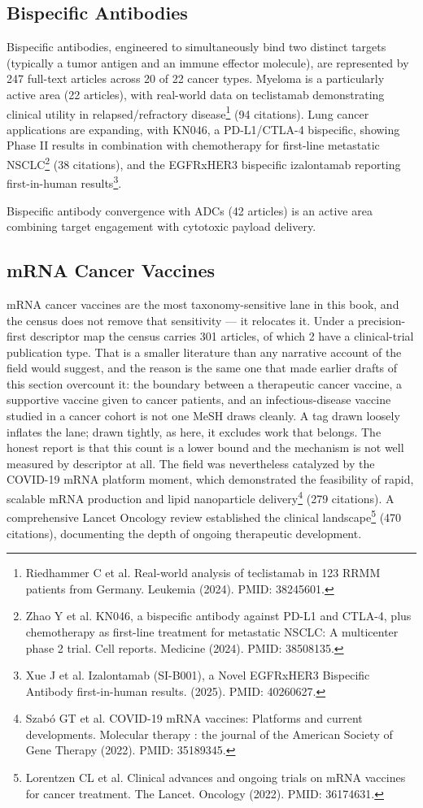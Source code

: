 \documentclass[11pt,twoside,openright]{report}
\begin{document}
\subsection{Bispecific Antibodies}

Bispecific antibodies, engineered to simultaneously bind two distinct targets (typically a tumor antigen and an immune effector molecule), are represented by 247 full-text articles across 20 of 22 cancer types. Myeloma is a particularly active area (22 articles), with real-world data on teclistamab demonstrating clinical utility in relapsed/refractory disease\footnote{Riedhammer C et al. Real-world analysis of teclistamab in 123 RRMM patients from Germany. Leukemia (2024). PMID: 38245601.} (94 citations). Lung cancer applications are expanding, with KN046, a PD-L1/CTLA-4 bispecific, showing Phase II results in combination with chemotherapy for first-line metastatic NSCLC\footnote{Zhao Y et al. KN046, a bispecific antibody against PD-L1 and CTLA-4, plus chemotherapy as first-line treatment for metastatic NSCLC: A multicenter phase 2 trial. Cell reports. Medicine (2024). PMID: 38508135.} (38 citations), and the EGFRxHER3 bispecific izalontamab reporting first-in-human results\footnote{Xue J et al. Izalontamab (SI-B001), a Novel EGFRxHER3 Bispecific Antibody first-in-human results. (2025). PMID: 40260627.}.

Bispecific antibody convergence with ADCs (42 articles) is an active area combining target engagement with cytotoxic payload delivery.

\subsection{mRNA Cancer Vaccines}

mRNA cancer vaccines are the most taxonomy-sensitive lane in this book, and the census does not remove that sensitivity --- it relocates it. Under a precision-first descriptor map the census carries 301 articles, of which 2 have a clinical-trial publication type. That is a smaller literature than any narrative account of the field would suggest, and the reason is the same one that made earlier drafts of this section overcount it: the boundary between a therapeutic cancer vaccine, a supportive vaccine given to cancer patients, and an infectious-disease vaccine studied in a cancer cohort is not one MeSH draws cleanly. A tag drawn loosely inflates the lane; drawn tightly, as here, it excludes work that belongs. The honest report is that this count is a lower bound and the mechanism is not well measured by descriptor at all. The field was nevertheless catalyzed by the COVID-19 mRNA platform moment, which demonstrated the feasibility of rapid, scalable mRNA production and lipid nanoparticle delivery\footnote{Szabó GT et al. COVID-19 mRNA vaccines: Platforms and current developments. Molecular therapy : the journal of the American Society of Gene Therapy (2022). PMID: 35189345.} (279 citations). A comprehensive Lancet Oncology review established the clinical landscape\footnote{Lorentzen CL et al. Clinical advances and ongoing trials on mRNA vaccines for cancer treatment. The Lancet. Oncology (2022). PMID: 36174631.} (470 citations), documenting the depth of ongoing therapeutic development.
\end{document}

